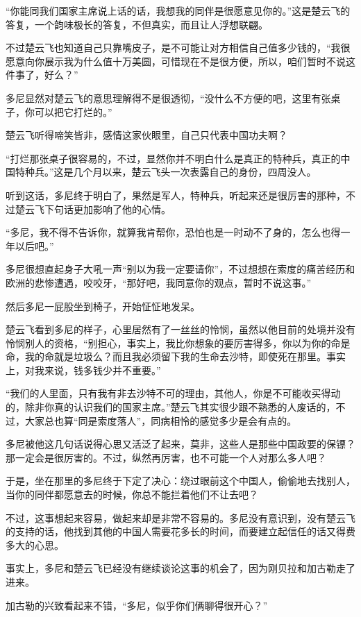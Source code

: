 “你能同我们国家主席说上话的话，我想我的同伴是很愿意见你的。”这是楚云飞的答复，一个韵味极长的答复，不但真实，而且让人浮想联翩。

不过楚云飞也知道自己只靠嘴皮子，是不可能让对方相信自己值多少钱的，“我很愿意向你展示我为什么值十万美圆，可惜现在不是很方便，所以，咱们暂时不说这件事了，好么？”

多尼显然对楚云飞的意思理解得不是很透彻，“没什么不方便的吧，这里有张桌子，你可以把它打烂的。”

楚云飞听得啼笑皆非，感情这家伙眼里，自己只代表中国功夫啊？

“打烂那张桌子很容易的，不过，显然你并不明白什么是真正的特种兵，真正的中国特种兵。”这是几个月以来，楚云飞头一次表露自己的身份，四周没人。

听到这话，多尼终于明白了，果然是军人，特种兵，听起来还是很厉害的那种，不过楚云飞下句话更加影响了他的心情。

“多尼，我不得不告诉你，就算我肯帮你，恐怕也是一时动不了身的，怎么也得一年以后吧。”

多尼很想直起身子大吼一声“别以为我一定要请你”，不过想想在索度的痛苦经历和欧洲的悲惨遭遇，咬咬牙，“那好吧，我同意你的观点，暂时不说这事。”

然后多尼一屁股坐到椅子，开始怔怔地发呆。

楚云飞看到多尼的样子，心里居然有了一丝丝的怜悯，虽然以他目前的处境并没有怜悯别人的资格，“别担心，事实上，我比你想象的要厉害得多，你以为你的命是命，我的命就是垃圾么？而且我必须留下我的生命去沙特，即使死在那里。事实上，对我来说，钱多钱少并不重要。”

“我们的人里面，只有我有非去沙特不可的理由，其他人，你是不可能收买得动的，除非你真的认识我们的国家主席。”楚云飞其实很少跟不熟悉的人废话的，不过，大家总也算“同是索度落人”，同病相怜的感觉多少是会有点的。

多尼被他这几句话说得心思又活泛了起来，莫非，这些人是那些中国政要的保镖？那一定会是很厉害的。不过，纵然再厉害，也不可能一个人对那么多人吧？

于是，坐在那里的多尼终于下定了决心：绕过眼前这个中国人，偷偷地去找别人，当你的同伴都愿意去的时候，你总不能拦着他们不让去吧？

不过，这事想起来容易，做起来却是非常不容易的。多尼没有意识到，没有楚云飞的支持的话，他找到其他的中国人需要花多长的时间，而要建立起信任的话又得费多大的心思。

事实上，多尼和楚云飞已经没有继续谈论这事的机会了，因为刚贝拉和加古勒走了进来。

加古勒的兴致看起来不错，“多尼，似乎你们俩聊得很开心？”

